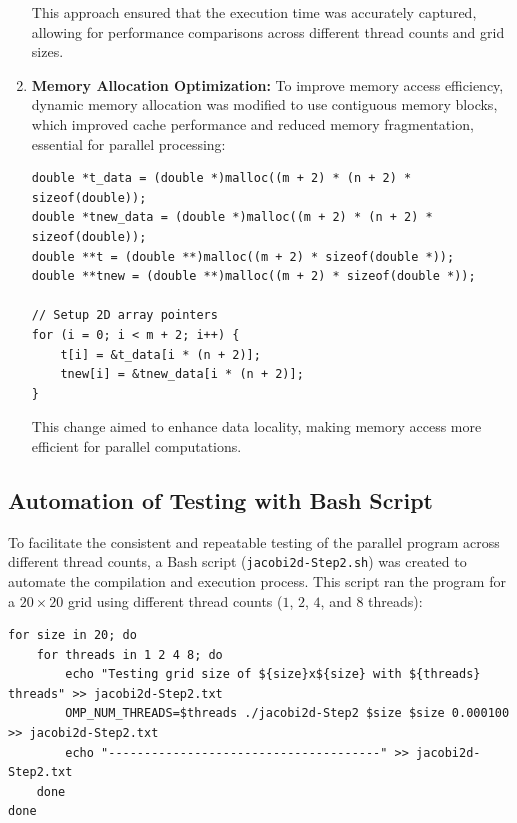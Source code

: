 \documentclass{article}
\begin{document}
\begin{enumerate}
    This approach ensured that the execution time was accurately captured, allowing for performance comparisons across different thread counts and grid sizes.

\item \textbf{Memory Allocation Optimization:} To improve memory access efficiency, dynamic memory allocation was modified to use contiguous memory blocks, which improved cache performance and reduced memory fragmentation, essential for parallel processing:

\begin{lstlisting}[style=CStyle, caption={Memory Allocation Optimization}]
double *t_data = (double *)malloc((m + 2) * (n + 2) * sizeof(double));
double *tnew_data = (double *)malloc((m + 2) * (n + 2) * sizeof(double));
double **t = (double **)malloc((m + 2) * sizeof(double *));
double **tnew = (double **)malloc((m + 2) * sizeof(double *));

// Setup 2D array pointers
for (i = 0; i < m + 2; i++) {
    t[i] = &t_data[i * (n + 2)];
    tnew[i] = &tnew_data[i * (n + 2)];
}
\end{lstlisting}

    This change aimed to enhance data locality, making memory access more efficient for parallel computations.

\end{enumerate}

\subsection{Automation of Testing with Bash Script}

To facilitate the consistent and repeatable testing of the parallel program across different thread counts, a Bash script (\texttt{jacobi2d-Step2.sh}) was created to automate the compilation and execution process. This script ran the program for a $20\times20$ grid using different thread counts ($1$, $2$, $4$, and $8$ threads):

\begin{lstlisting}[style=BashStyle, caption={Execution Across Thread Counts}]
for size in 20; do
    for threads in 1 2 4 8; do
        echo "Testing grid size of ${size}x${size} with ${threads} threads" >> jacobi2d-Step2.txt
        OMP_NUM_THREADS=$threads ./jacobi2d-Step2 $size $size 0.000100 >> jacobi2d-Step2.txt
        echo "--------------------------------------" >> jacobi2d-Step2.txt
    done
done
\end{lstlisting}
\end{document}
